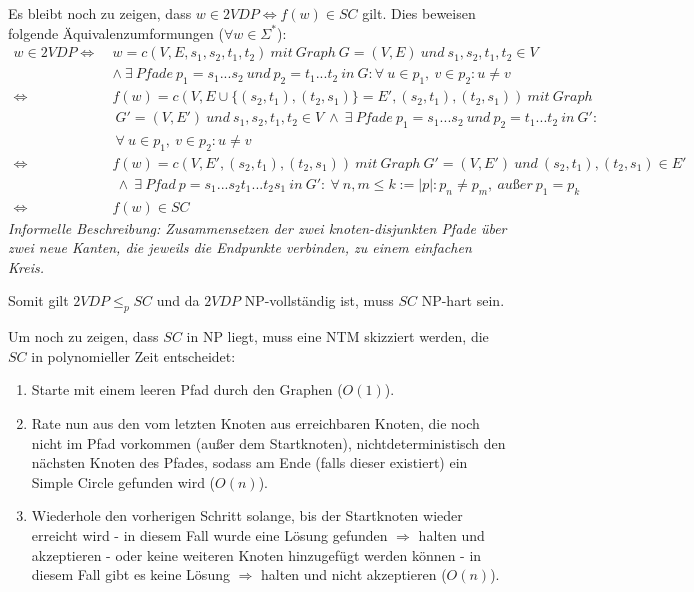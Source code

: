 	Es bleibt noch zu zeigen, dass $w \in 2VDP \Leftrightarrow f(w) \in SC$ gilt. Dies beweisen folgende Äquivalenzumformungen ($\forall w \in \Sigma^*$):
	\begin{align*}
		w \in 2VDP \Longleftrightarrow\ &w=c(V,E,s_1,s_2,t_1,t_2)\ mit\ Graph\ G=(V,E)\ und\ s_1,s_2,t_1,t_2 \in V\\
		&\wedge\ \exists\ Pfade\ p_1=s_1...s_2\ und\ p_2=t_1...t_2\ in\ G: \forall\ u \in p_1,\ v \in p_2: u\neq v\\
		\Leftrightarrow\ &f(w)=c(V,E\cup \{(s_2,t_1),(t_2,s_1)\}=E',(s_2,t_1),(t_2,s_1))\ mit\ Graph\\
		&\ G'=(V,E')\ und\ s_1,s_2,t_1,t_2 \in V\ \wedge\ \exists\ Pfade\ p_1=s_1...s_2\ und\ p_2=t_1...t_2\ in\ G':\\
		&\ \forall\ u \in p_1,\ v \in p_2: u\neq v\\
		\Leftrightarrow\ &f(w)=c(V,E',(s_2,t_1),(t_2,s_1))\ mit\ Graph\ G'=(V,E')\ und\ (s_2,t_1),(t_2,s_1) \in E'\\
		&\ \wedge\ \exists\ Pfad\ p=s_1...s_2t_1...t_2s_1\ in\ G':\ \forall\ n,m \leq k:=|p| : p_n\neq p_m,\ außer\ p_1=p_k \\
		\Leftrightarrow\ &f(w) \in SC
	\end{align*}
	\textit{Informelle Beschreibung: Zusammensetzen der zwei knoten-disjunkten Pfade über zwei neue Kanten, die jeweils die Endpunkte verbinden, zu einem einfachen Kreis.}

	Somit gilt $2VDP \leq_p SC$ und da $2VDP$ NP-vollständig ist,  muss $SC$ NP-hart sein.
	
	Um noch zu zeigen, dass $SC$ in NP liegt, muss eine NTM skizziert werden, die $SC$ in polynomieller Zeit entscheidet:
	\begin{enumerate}
		\item Starte mit einem leeren Pfad durch den Graphen ($O(1)$).
		\item Rate nun aus den vom letzten Knoten aus erreichbaren Knoten, die noch nicht im Pfad vorkommen (außer dem Startknoten), nichtdeterministisch den nächsten Knoten des Pfades, sodass am Ende (falls dieser existiert) ein Simple Circle gefunden wird ($O(n)$).
		\item Wiederhole den vorherigen Schritt solange, bis der Startknoten wieder erreicht wird - in diesem Fall wurde eine Lösung gefunden $\Rightarrow$ halten und akzeptieren - oder keine weiteren Knoten hinzugefügt werden können - in diesem Fall gibt es keine Lösung $\Rightarrow$ halten und nicht akzeptieren ($O(n)$).
	\end{enumerate}

